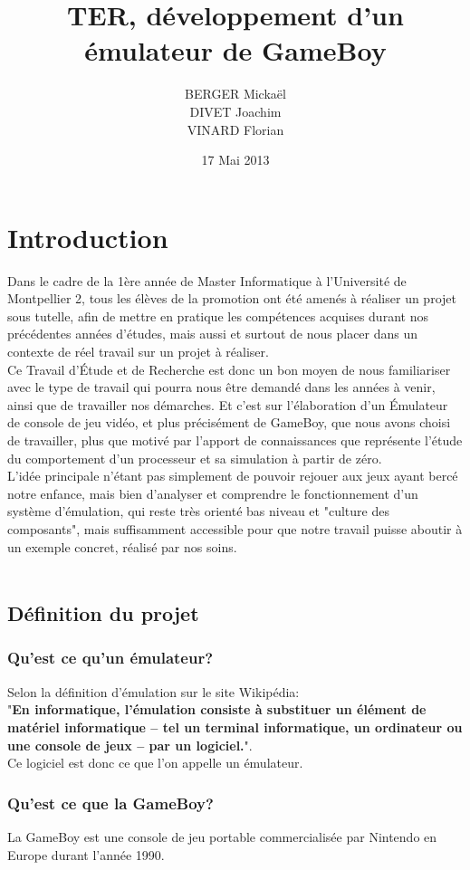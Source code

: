 \documentclass{report}
\title{TER, développement d'un émulateur de GameBoy}
\author{BERGER Mickaël \\ DIVET Joachim \\ VINARD Florian}
\date{17 Mai 2013}
\begin{document}
\maketitle
\tableofcontents
\chapter*{Introduction}
	Dans le cadre de la 1ère année de Master Informatique à l'Université de Montpellier
	2, tous les élèves de la promotion ont été amenés à réaliser un projet
	sous tutelle, afin de mettre en pratique les compétences acquises
	durant nos précédentes années d'études, mais aussi et surtout de nous
	placer dans un contexte de réel travail sur un projet à réaliser.\\
	Ce Travail d'Étude et de Recherche est donc un bon moyen de nous
	familiariser avec le type de travail qui pourra nous être demandé dans
	les années à venir, ainsi que de travailler nos démarches.
	Et c'est sur l'élaboration d'un Émulateur de console de jeu vidéo, et plus précisément de GameBoy,
	que nous avons choisi de travailler, plus que motivé par l'apport de
	connaissances que représente l'étude du comportement d'un processeur
	et sa simulation à partir de zéro.
	\\
	L'idée principale n'étant pas simplement de pouvoir rejouer aux jeux
	ayant bercé notre enfance, mais bien d'analyser et comprendre le
	fonctionnement d'un système d'émulation, qui reste très orienté bas
	niveau et "culture des composants", mais suffisamment accessible pour
	que notre travail puisse aboutir à un exemple concret, réalisé par nos
	soins.\\
	\\

\section*{Définition du projet}
\subsection*{Qu'est ce qu'un émulateur?}
	Selon la définition d'émulation sur le site Wikipédia:\\"\textbf{En informatique, l'émulation consiste à substituer un élément de matériel informatique – tel un terminal informatique, un ordinateur ou une console de jeux – par un logiciel.}".\\Ce logiciel est donc ce que l'on appelle un émulateur.
\subsection*{Qu'est ce que la GameBoy?}
	La GameBoy est une console de jeu portable commercialisée par Nintendo en Europe durant l'année 1990.
\end{document}

